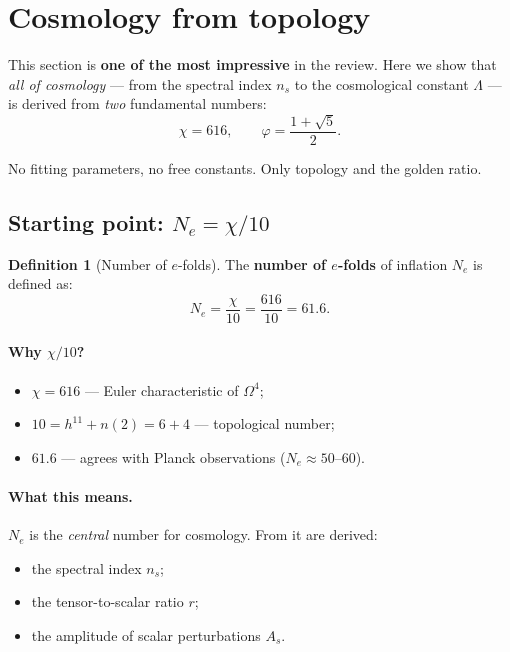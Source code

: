 \documentclass[11pt,a4paper]{article}
\newcommand{\Om}{\Omega^4}
\theoremstyle{definition}
\newtheorem{definition}[theorem]{Definition}
\begin{document}
\section{Cosmology from topology}
\label{sec:cosmology}

This section is \textbf{one of the most impressive} in the review. 
Here we show that \emph{all of cosmology} — from the 
spectral index $n_s$ to the cosmological constant 
$\Lambda$ — is derived from \emph{two} fundamental numbers:
\begin{equation}
    \chi = 616, \qquad \varphi = \frac{1 + \sqrt{5}}{2}.
\end{equation}

No fitting parameters, no free constants. 
Only topology and the golden ratio.

\subsection{Starting point: $N_e = \chi/10$}
\label{subsec:ne-folds}

\begin{definition}[Number of $e$-folds]
\label{def:ne-folds}
The \textbf{number of $e$-folds} of inflation $N_e$ is defined as:
\begin{equation}
    \boxed{
    N_e = \frac{\chi}{10} = \frac{616}{10} = 61.6.
    }
    \label{eq:ne-folds}
\end{equation}
\end{definition}

\paragraph{Why $\chi/10$?}
\begin{itemize}
    \item $\chi = 616$ — Euler characteristic of $\Om$;
    \item $10 = h^{11} + n(2) = 6 + 4$ — topological number;
    \item $61.6$ — agrees with Planck observations 
          ($N_e \approx 50$--$60$).
\end{itemize}

\paragraph{What this means.}
$N_e$ is the \emph{central} number for cosmology. From it 
are derived:
\begin{itemize}
    \item the spectral index $n_s$;
    \item the tensor-to-scalar ratio $r$;
    \item the amplitude of scalar perturbations $A_s$.
\end{itemize}
\end{document}
